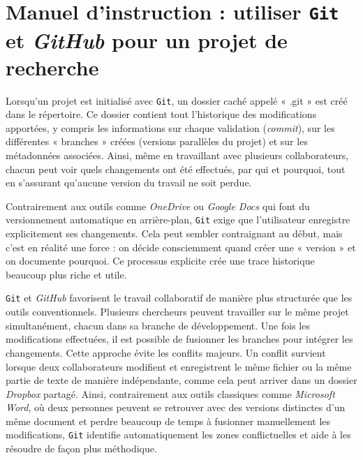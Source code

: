 \documentclass[
  letterpaper,
  DIV=11,
  numbers=noendperiod,
  oneside]{scrreprt}
\begin{document}
\hypertarget{manuel-dinstruction-utiliser-git-et-github-pour-un-projet-de-recherche}{%
\section{\texorpdfstring{Manuel d'instruction : utiliser \texttt{Git} et
\emph{GitHub} pour un projet de
recherche}{Manuel d'instruction : utiliser Git et GitHub pour un projet de recherche}}\label{manuel-dinstruction-utiliser-git-et-github-pour-un-projet-de-recherche}}

Lorsqu'un projet est initialisé avec \texttt{Git}, un dossier caché
appelé « .git » est créé dans le répertoire. Ce dossier contient tout
l'historique des modifications apportées, y compris les informations sur
chaque validation (\emph{commit}), sur les différentes « branches »
créées (versions parallèles du projet) et sur les métadonnées associées.
Ainsi, même en travaillant avec plusieurs collaborateurs, chacun peut
voir quels changements ont été effectués, par qui et pourquoi, tout en
s'assurant qu'aucune version du travail ne soit perdue.

Contrairement aux outils comme \emph{OneDrive} ou \emph{Google Docs} qui
font du versionnement automatique en arrière-plan, \texttt{Git} exige
que l'utilisateur enregistre explicitement ses changements. Cela peut
sembler contraignant au début, mais c'est en réalité une force : on
décide consciemment quand créer une « version » et on documente
pourquoi. Ce processus explicite crée une trace historique beaucoup plus
riche et utile.

\texttt{Git} et \emph{GitHub} favorisent le travail collaboratif de
manière plus structurée que les outils conventionnels. Plusieurs
chercheurs peuvent travailler sur le même projet simultanément, chacun
dans sa branche de développement. Une fois les modifications effectuées,
il est possible de fusionner les branches pour intégrer les changements.
Cette approche évite les conflits majeurs. Un conflit survient lorsque
deux collaborateurs modifient et enregistrent le même fichier ou la même
partie de texte de manière indépendante, comme cela peut arriver dans un
dossier \emph{Dropbox} partagé. Ainsi, contrairement aux outils
classiques comme \emph{Microsoft Word}, où deux personnes peuvent se
retrouver avec des versions distinctes d'un même document et perdre
beaucoup de temps à fusionner manuellement les modifications,
\texttt{Git} identifie automatiquement les zones conflictuelles et aide
à les résoudre de façon plus méthodique.
\end{document}
